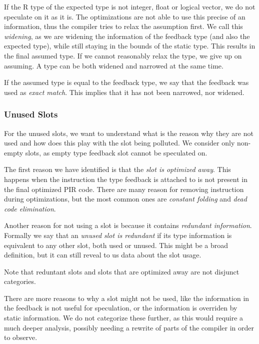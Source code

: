 If the R type of the expected type is not integer, float or logical vector, we do not speculate on it as it is. The optimizations are not able to use this precise of an information, thus the compiler tries to relax the assumption first. We call this \textit{widening}, as we are widening the information of the feedback type (and also the expected type), while still staying in the bounds of the static type. This results in the final assumed type. If we cannot reasonably relax the type, we give up on assuming. A type can be both widened and narrowed at the same time.

If the assumed type is equal to the feedback type, we say that the feedback was used as \textit{exact match}. This implies that it has not been narrowed, nor widened.

\subsubsection*{Unused Slots}

For the unused slots, we want to understand what is the reason why they are not used and how does this play with the slot being polluted. We consider only non-empty slots, as empty type feedback slot cannot be speculated on.

The first reason we have identified is that the \textit{slot is optimized away}. This happens when the instruction the type feedback is attached to is not present in the final optimized PIR code. There are many reason for removing instruction during optimizations, but the most common ones are \textit{constant folding} and \textit{dead code elimination}.

Another reason for not using a slot is because it contains \textit{redundant information}. Formally we say that an \textit{unused slot is redundant} if its type information is equivalent to any other slot, both used or unused. This might be a broad definition, but it can still reveal to us data about the slot usage.

Note that reduntant slots and slots that are optimized away are not disjunct categories.

There are more reasons to why a slot might not be used, like the information in the feedback is not useful for speculation, or the information is overriden by static information. We do not categorize these further, as this would require a much deeper analysis, possibly needing a rewrite of parts of the compiler in order to observe.

